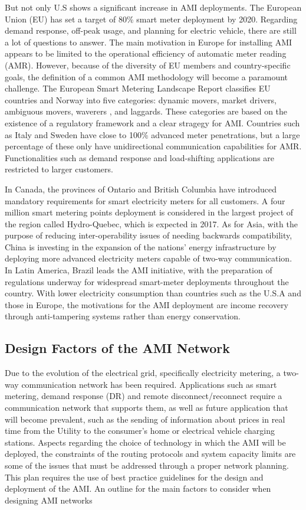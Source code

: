 \documentclass[11pt,final,onecolumn]{IEEEtran}
\begin{document}
But not only U.S shows a significant increase in AMI deployments. The European Union (EU) has set a target of 80\% smart meter deployment by 2020. Regarding demand response, off-peak usage, and planning for electric vehicle, there are still a lot of questions to answer.  The main motivation in Europe for installing AMI appears to be limited to the operational efficiency of automatic meter reading (AMR). However, because of the diversity of EU members and country-specific goals, the definition of a common AMI methodology will become a paramount challenge. The European Smart Metering Landscape Report \cite{SmartRegions2012} classifies EU countries and Norway into five categories: dynamic movers,  market drivers, ambiguous movers, waverers , and laggards. These categories are based on the existence of a regulatory framework and a clear stragegy for AMI. Countries such as Italy and Sweden have close to 100\% advanced meter penetrations, but a large percentage of these only have unidirectional communication capabilities for AMR. Functionalities such as demand response and load-shifting applications are restricted to larger customers. 

In Canada, the provinces of Ontario and British Columbia have introduced mandatory requirements for smart electricity meters for all customers. A four million smart metering points deployment is considered in the largest project of the region called Hydro-Quebec, which is expected in 2017. As for Asia, with the purpose of reducing inter-operability issues of needing backwards compatibility, China is investing in the expansion of the nations’ energy infrastructure by deploying more advanced electricity meters capable of two-way communication. In Latin America, Brazil leads the AMI initiative, with the preparation of regulations underway for widespread smart-meter deployments throughout the country. With lower electricity consumption than countries such as the U.S.A and those in Europe, the motivations for the AMI deployment are income recovery through anti-tampering systems rather than energy conservation.  


\subsection{Design Factors of the AMI Network}\label{designFactors}

Due to the evolution of the electrical grid, specifically electricity metering, a two-way communication network has been required. Applications such as smart metering, demand response (DR) and remote disconnect/reconnect require a communication network that supports them, as well as future application that will become prevalent, such as the sending of information about prices in real time from the Utility to the consumer’s home or electrical vehicle charging stations.  
Aspects regarding the choice of technology in which the AMI will be deployed, the constraints of the routing protocols and system capacity limits are some of the issues that must be addressed through a proper network planning. This plan requires the use of best practice guidelines for the design and deployment of the AMI. An outline for the main factors to consider when designing AMI networks
\end{document}
